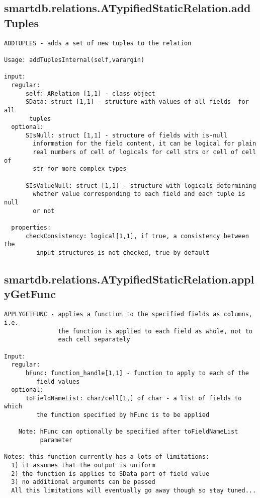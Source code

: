 \subsection{\texorpdfstring{smartdb.relations.ATypifiedStaticRelation.addTuples}{addTuples}}\label{method:smartdb.relations.ATypifiedStaticRelation.addTuples}
\begin{verbatim}
ADDTUPLES - adds a set of new tuples to the relation

Usage: addTuplesInternal(self,varargin)

input:
  regular:
      self: ARelation [1,1] - class object
      SData: struct [1,1] - structure with values of all fields  for all
       tuples
  optional:
      SIsNull: struct [1,1] - structure of fields with is-null
        information for the field content, it can be logical for plain
        real numbers of cell of logicals for cell strs or cell of cell of
        str for more complex types

      SIsValueNull: struct [1,1] - structure with logicals determining
        whether value corresponding to each field and each tuple is null
        or not

  properties:
      checkConsistency: logical[1,1], if true, a consistency between the
         input structures is not checked, true by default
\end{verbatim}
\subsection{\texorpdfstring{smartdb.relations.ATypifiedStaticRelation.applyGetFunc}{applyGetFunc}}\label{method:smartdb.relations.ATypifiedStaticRelation.applyGetFunc}
\begin{verbatim}
APPLYGETFUNC - applies a function to the specified fields as columns, i.e.
               the function is applied to each field as whole, not to
               each cell separately

Input:
  regular:
      hFunc: function_handle[1,1] - function to apply to each of the
         field values
  optional:
      toFieldNameList: char/cell[1,] of char - a list of fields to which
         the function specified by hFunc is to be applied

    Note: hFunc can optionally be specified after toFieldNameList
          parameter

Notes: this function currently has a lots of limitations:
  1) it assumes that the output is uniform
  2) the function is applies to SData part of field value
  3) no additional arguments can be passed
  All this limitations will eventually go away though so stay tuned...
\end{verbatim}
